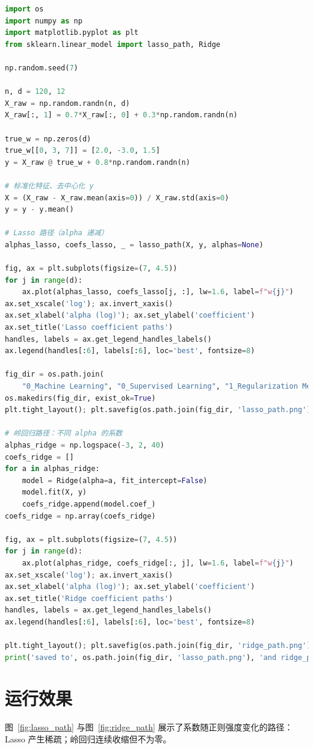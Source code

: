 \documentclass[UTF8,zihao=-4]{ctexart}
\begin{document}
\begin{lstlisting}[language=Python,caption={gen_regularization_figures.py}]
import os
import numpy as np
import matplotlib.pyplot as plt
from sklearn.linear_model import lasso_path, Ridge

np.random.seed(7)

n, d = 120, 12
X_raw = np.random.randn(n, d)
X_raw[:, 1] = 0.7*X_raw[:, 0] + 0.3*np.random.randn(n)

true_w = np.zeros(d)
true_w[[0, 3, 7]] = [2.0, -3.0, 1.5]
y = X_raw @ true_w + 0.8*np.random.randn(n)

# 标准化特征、去中心化 y
X = (X_raw - X_raw.mean(axis=0)) / X_raw.std(axis=0)
y = y - y.mean()

# Lasso 路径（alpha 递减）
alphas_lasso, coefs_lasso, _ = lasso_path(X, y, alphas=None)

fig, ax = plt.subplots(figsize=(7, 4.5))
for j in range(d):
    ax.plot(alphas_lasso, coefs_lasso[j, :], lw=1.6, label=f"w{j}")
ax.set_xscale('log'); ax.invert_xaxis()
ax.set_xlabel('alpha (log)'); ax.set_ylabel('coefficient')
ax.set_title('Lasso coefficient paths')
handles, labels = ax.get_legend_handles_labels()
ax.legend(handles[:6], labels[:6], loc='best', fontsize=8)

fig_dir = os.path.join(
    "0_Machine Learning", "0_Supervised Learning", "1_Regularization Methods in Regression", "figures")
os.makedirs(fig_dir, exist_ok=True)
plt.tight_layout(); plt.savefig(os.path.join(fig_dir, 'lasso_path.png'), dpi=160)

# 岭回归路径：不同 alpha 的系数
alphas_ridge = np.logspace(-3, 2, 40)
coefs_ridge = []
for a in alphas_ridge:
    model = Ridge(alpha=a, fit_intercept=False)
    model.fit(X, y)
    coefs_ridge.append(model.coef_)
coefs_ridge = np.array(coefs_ridge)

fig, ax = plt.subplots(figsize=(7, 4.5))
for j in range(d):
    ax.plot(alphas_ridge, coefs_ridge[:, j], lw=1.6, label=f"w{j}")
ax.set_xscale('log'); ax.invert_xaxis()
ax.set_xlabel('alpha (log)'); ax.set_ylabel('coefficient')
ax.set_title('Ridge coefficient paths')
handles, labels = ax.get_legend_handles_labels()
ax.legend(handles[:6], labels[:6], loc='best', fontsize=8)

plt.tight_layout(); plt.savefig(os.path.join(fig_dir, 'ridge_path.png'), dpi=160)
print('saved to', os.path.join(fig_dir, 'lasso_path.png'), 'and ridge_path.png')
\end{lstlisting}

\section{运行效果}
图~\ref{fig:lasso_path} 与图~\ref{fig:ridge_path} 展示了系数随正则强度变化的路径：Lasso 产生稀疏；岭回归连续收缩但不为零。
\end{document}
